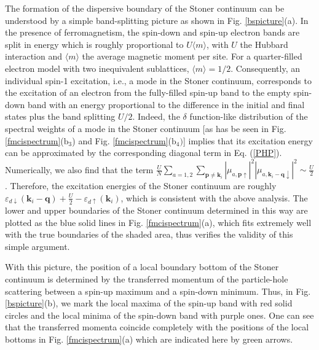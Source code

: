\documentclass[amsmath,superscriptaddress,showpacs,aps,prb,twocolumn]{revtex4-1}
\begin{document}
\par The formation of the dispersive boundary of the Stoner continuum can be understood by a simple band-splitting picture as shown in Fig. \ref{bspicture}(a). In the presence of ferromagnetism, the spin-down and spin-up electron bands are split in energy which is roughly proportional to $U\langle m \rangle$, with $U$ the Hubbard interaction and $\langle m \rangle$ the average magnetic moment per site. For a quarter-filled electron model with two inequivalent sublattices, $\langle m \rangle=1/2$. Consequently, an individual spin-1 excitation, i.e., a mode in the Stoner continuum, corresponds to the excitation of an electron from the fully-filled spin-up band to the empty spin-down band with an energy proportional to the difference in the initial and final states plus the band splitting $U/2$.
Indeed, the $\delta$ function-like distribution of the spectral weights of a mode in the Stoner continuum [as has be seen in Fig. \ref{fmcispectrum}($\text{b}_3$) and Fig. \ref{fmcispectrum}($\text{b}_4)$] implies that its excitation energy can be approximated by the corresponding diagonal term in Eq. (\ref{PHP}). Numerically, we also find that the term $\frac{U}{N} \sum_{a=1,2} \sum_{\mathbf{p}\neq\mathbf{k}_i} \left| \mu_{a,\mathbf{p}\uparrow} \right|^2 \left| \mu_{a,\mathbf{k}_{i}-\mathbf{q}\downarrow} \right|^2 \sim \frac{U}{2}$. Therefore, the excitation energies of the Stoner continuum are roughly $\varepsilon_{d\downarrow} (\mathbf{k}_i-\mathbf{q}) + \frac{U}{2} -\varepsilon_{d\uparrow} (\mathbf{k}_i)$, which is consistent with the above analysis. The lower and upper boundaries of the Stoner continuum determined in this way are plotted as the blue solid lines in Fig. \ref{fmcispectrum}(a), which fits extremely well with the true boundaries of the shaded area, thus verifies the validity of this simple argument.

\par With this picture, the position of a local boundary bottom of the Stoner continuum is determined by the transferred momentum of the particle-hole scattering between a spin-up maximum and a spin-down minimum. Thus, in Fig. \ref{bspicture}(b), we mark the local maxima of the spin-up band with red solid circles and the local minima of the spin-down band with purple ones. One can see that the transferred momenta coincide completely with the positions
 of the local bottoms in Fig. \ref{fmcispectrum}(a) which are indicated here by green arrows.
\end{document}
